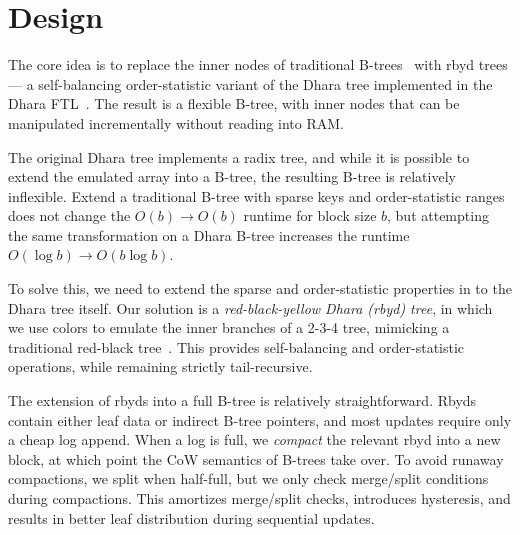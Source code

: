 \documentclass[letterpaper,twocolumn,10pt]{article}
\begin{document}
\section{Design}
\label{sec:design}

The core idea is to replace the inner nodes of traditional
B-trees~\cite{ubiquitous-btree} with rbyd trees---%
a self-balancing order-statistic variant of the Dhara tree implemented in the
Dhara FTL~\cite{dhara}.
The result is a flexible B-tree, with inner nodes that can be
manipulated incrementally without reading into RAM.

The original Dhara tree implements a radix tree, and while it is
possible to extend the emulated array into a B-tree, the resulting
B-tree is relatively inflexible.
Extend a traditional B-tree with sparse keys and order-statistic ranges
does not change the $O(b) \rightarrow O(b)$ runtime for block size $b$,
but attempting the same transformation on a Dhara B-tree increases the
runtime $O(\log b) \rightarrow O(b \log b)$.

To solve this, we need to extend the sparse and order-statistic
properties in to the Dhara tree itself.
Our solution is a \emph{red-black-yellow Dhara (rbyd) tree}, %
in which we use colors to emulate the inner branches of a 2-3-4 tree,
mimicking a traditional red-black tree~\cite{rbtree}.
This provides self-balancing and order-statistic operations, while
remaining strictly tail-recursive.


The extension of rbyds into a full B-tree is relatively straightforward.
Rbyds contain either leaf data or indirect B-tree pointers, and most
updates require only a cheap log append. When a log is full, we \emph{compact}
the relevant rbyd into a new block, at which point the CoW
semantics of B-trees take over.
To avoid runaway compactions, we split when half-full, but we only check
merge/split conditions during compactions.
This
amortizes merge/split checks,
introduces hysteresis, and results in
better
leaf distribution during
sequential updates.
\end{document}

